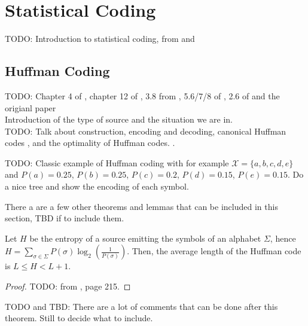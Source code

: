 \clearpage
\section{Statistical Coding} \label{sec:statistical_coding}

TODO: Introduction to statistical coding, from \cite{han2002mathematics} and \cite{ferragina2023pearls}

\subsection{Huffman Coding}

TODO: Chapter 4 of \cite{sayood2002lossless}, chapter 12 of \cite{ferragina2023pearls}, 3.8 from \cite{han2002mathematics}, 5.6/7/8 of \cite{ElementsofInformationTheory}, 2.6 of \cite{navarro2016compact} and the origianl paper \cite{Huffman1952}\\


\noindent Introduction of the type of source and the situation we are in.\\



\noindent TODO: Talk about construction, encoding and decoding, canonical Huffman codes \cite{schwartz1964generating}, and the optimality of Huffman codes. \cite{ferragina2023pearls,sayood2002lossless}.\\

\begin{example}
    TODO: Classic example of Huffman coding with for example $\mathcal{X} = \{a,b,c,d,e\}$ and $P(a)= 0.25$, $P(b)=0.25$, $P(c)=0.2$, $P(d)=0.15$, $P(e)=0.15$. Do a nice tree and show the encoding of each symbol.
\end{example}
\noindent There a are a few other theorems and lemmas that can be included in this section, TBD if to include them.\\
\begin{theorem}
    Let $H$ be the entropy of a source emitting the symbols of an alphabet $\Sigma$, hence $H = \sum_{\sigma \in \Sigma} P(\sigma)\log_2\left(\frac{1}{P(\sigma)}\right)$. Then, the average length of the Huffman code is $L \leq H < L + 1$.
\end{theorem}
\begin{proof}
    TODO: from \cite{ferragina2023pearls}, page 215.
\end{proof}
TODO and TBD: There are a lot of comments that can be done after this theorem. Still to decide what to include.

